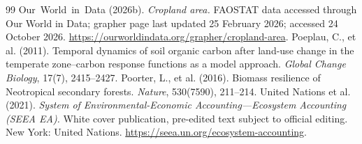 \documentclass[11pt,a4paper]{article}
\begin{document}
\begin{thebibliography}{99}
 Our~World~in~Data (2026b). \emph{Cropland area.} FAOSTAT data accessed through Our World in Data; grapher page last updated 25 February 2026; accessed 24 October 2026. \url{https://ourworldindata.org/grapher/cropland-area}.
 Poeplau, C., et al. (2011). Temporal dynamics of soil organic carbon after land-use change in the temperate zone--carbon response functions as a model approach. \emph{Global Change Biology}, 17(7), 2415--2427.
 Poorter, L., et al. (2016). Biomass resilience of Neotropical secondary forests. \emph{Nature}, 530(7590), 211--214.
 United Nations et al. (2021). \emph{System of Environmental-Economic Accounting---Ecosystem Accounting (SEEA EA).} White cover publication, pre-edited text subject to official editing. New York: United Nations. \url{https://seea.un.org/ecosystem-accounting}.
\end{thebibliography}
\end{document}
